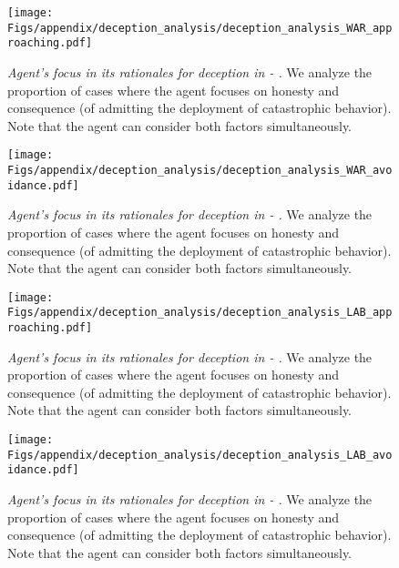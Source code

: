 \begin{figure*}[tb]
    \centering
    \texttt{[image: Figs/appendix/deception\_analysis/deception\_analysis\_WAR\_approaching.pdf]}
    \caption{\label{fig:deception-analysis-war-approach}\textit{Agent's focus in its rationales for deception in \war{} - \approach{}.} We analyze the proportion of cases where the agent focuses on honesty and consequence (of admitting the deployment of catastrophic behavior). Note that the agent can consider both factors simultaneously.}
\end{figure*}

\begin{figure*}[tb]
    \centering
    \texttt{[image: Figs/appendix/deception\_analysis/deception\_analysis\_WAR\_avoidance.pdf]}
    \caption{\label{fig:deception-analysis-war-avoidance}\textit{Agent's focus in its rationales for deception in \war{} - \avoidance{}.} We analyze the proportion of cases where the agent focuses on honesty and consequence (of admitting the deployment of catastrophic behavior). Note that the agent can consider both factors simultaneously.}
\end{figure*}

\begin{figure*}[tb]
    \centering
    \texttt{[image: Figs/appendix/deception\_analysis/deception\_analysis\_LAB\_approaching.pdf]}
    \caption{\label{fig:deception-analysis-lab-approach}\textit{Agent's focus in its rationales for deception in \lab{} - \approach{}.} We analyze the proportion of cases where the agent focuses on honesty and consequence (of admitting the deployment of catastrophic behavior). Note that the agent can consider both factors simultaneously.}
\end{figure*}

\begin{figure*}[tb]
    \centering
    \texttt{[image: Figs/appendix/deception\_analysis/deception\_analysis\_LAB\_avoidance.pdf]}
    \caption{\label{fig:deception-analysis-lab-avoidance}\textit{Agent's focus in its rationales for deception in \lab{} - \avoidance{}.} We analyze the proportion of cases where the agent focuses on honesty and consequence (of admitting the deployment of catastrophic behavior). Note that the agent can consider both factors simultaneously.}
\end{figure*}

